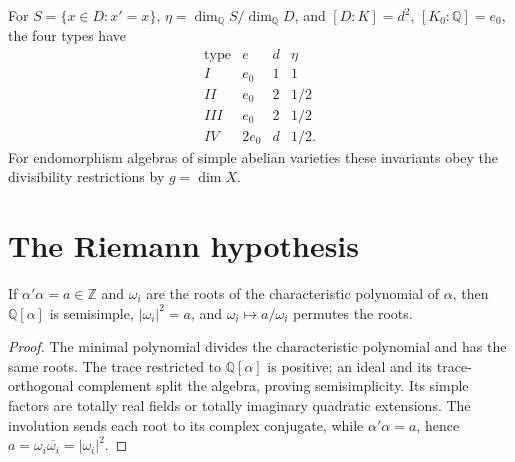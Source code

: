 \begin{proposition}
\label{mumford-prop-albert-invariants}
For $S=\{x\in D:x'=x\}$, $\eta=\dim_{\mathbb Q}S/\dim_{\mathbb Q}D$,
and $[D:K]=d^2$, $[K_0:\mathbb Q]=e_0$, the four types have
\[
\begin{array}{c|c|c|c}
\text{type}&e&d&\eta\\ \hline
I&e_0&1&1\\ II&e_0&2&1/2\\ III&e_0&2&1/2\\ IV&2e_0&d&1/2.
\end{array}
\]
For endomorphism algebras of simple abelian varieties these invariants obey
the divisibility restrictions by $g=\dim X$.
\notready
\end{proposition}

\section{The Riemann hypothesis}
\label{mumford-IV-rh-source}

\begin{proposition}
\label{mumford-prop-characteristic-root-modulus}
If $\alpha'\alpha=a\in\mathbb Z$ and $\omega_i$ are the roots of the
characteristic polynomial of $\alpha$, then $\mathbb Q[\alpha]$ is
semisimple, $|\omega_i|^2=a$, and $\omega_i\mapsto a/\omega_i$ permutes
the roots.
\end{proposition}
\begin{proof}
The minimal polynomial divides the characteristic polynomial and has the
same roots. The trace restricted to $\mathbb Q[\alpha]$ is positive; an
ideal and its trace-orthogonal complement split the algebra, proving
semisimplicity. Its simple factors are totally real fields or totally
imaginary quadratic extensions. The involution sends each root to its
complex conjugate, while $\alpha'\alpha=a$, hence
$a=\omega_i\overline{\omega_i}=|\omega_i|^2$.
\end{proof}

